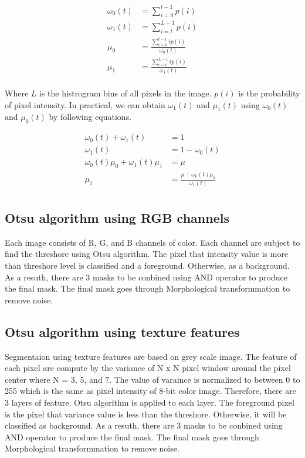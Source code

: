 \documentclass[11pt]{article}
\begin{document}
\begin{align*}
\omega_0(t) &= \sum_{i=0}^{t-1} p(i) \\
\omega_1(t) &= \sum_{i=t}^{L-1} p(i) \\
\mu_0 &= \frac{\sum_{i=0}^{t-1} ip(i)}{\omega_0(t)} \\
\mu_1 &= \frac{\sum_{i=t}^{L-1} ip(i)}{\omega_1(t)} \\
\end{align*}

Where $L$ is the histrogram bins of all pixels in the image. $p(i)$ is the probability of pixel intensity. In practical, we can obtain $\omega_1(t)$ and $\mu_1(t)$ using $\omega_0(t)$ and $\mu_0(t)$ by following equations.

\begin{align*}
\omega_0(t)  + \omega_1(t) &= 1 \\
\omega_1(t) &= 1 - \omega_0(t) \\
\omega_0(t)  \mu_0  + \omega_1(t) \mu_1&= \mu \\
\mu_1 &= \frac{\mu - \omega_0(t)  \mu_0}{\omega_1(t)} \\
\end{align*}



\subsection*{Otsu algorithm using RGB channels}

Each image consists of R, G, and B channels of color. Each channel are subject to find the threshore using Otsu algorithm. The pixel that intensity value is more than threshore level is classified and a foreground. Otherwise, as a background. As a resuth, there are 3 masks to be conbined using AND operator to produce the final mask. The final mask goes through Morphological transformmation to remove noise. 



\subsection*{Otsu algorithm using texture features}

Segmentaion using texture features are based on grey scale image. The feature of each pixel are compute by the variance of N x N pixel window around the pixel center where N = 3, 5, and 7. The value of varaince is normalized to between 0 to 255 which is the same as pixel intensity of 8-bit color image. Therefore, there are 3 layers of feature. Otsu algorithm is applied to each layer. The foreground pixel is the pixel that variance value is less than the threshore. Otherwise, it will be classified as background.  As a resuth, there are 3 masks to be conbined using AND operator to produce the final mask. The final mask goes through Morphological transformmation to remove noise. 
\end{document}
